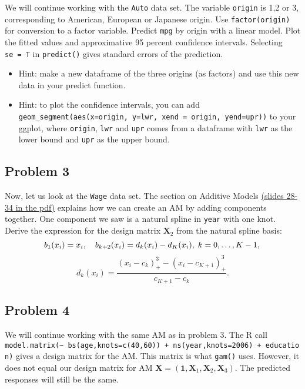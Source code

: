 \documentclass[
]{article}
\begin{document}
We will continue working with the \texttt{Auto} data set. The variable
\texttt{origin} is 1,2 or 3, corresponding to American, European or
Japanese origin. Use \texttt{factor(origin)} for conversion to a factor
variable. Predict \texttt{mpg} by origin with a linear model. Plot the
fitted values and approximative 95 percent confidence intervals.
Selecting \texttt{se\ =\ T} in \texttt{predict()} gives standard errors
of the prediction.

\begin{itemize}
\item
  Hint: make a new dataframe of the three origins (as factors) and use
  this new data in your predict function.
\item
  Hint: to plot the confidence intervals, you can add
  \texttt{geom\_segment(aes(x=origin,\ y=lwr,\ xend\ =\ origin,\ yend=upr))}
  to your ggplot, where \texttt{origin}, \texttt{lwr} and \texttt{upr}
  comes from a dataframe with \texttt{lwr} as the lower bound and
  \texttt{upr} as the upper bound.
\end{itemize}

\hypertarget{problem-3}{%
\subsection{Problem 3}\label{problem-3}}

Now, let us look at the \texttt{Wage} data set. The section on Additive
Models
\href{https://github.com/stefaniemuff/statlearning/blob/master/7BeyondLinear/7BeyondLinear.pdf}{(slides
28-34 in the pdf)} explains how we can create an AM by adding components
together. One component we saw is a natural spline in \texttt{year} with
one knot. Derive the expression for the design matrix \(\mathbf X_2\)
from the natural spline basis: \[
b_1(x_i) = x_i, \quad b_{k+2}(x_i) = d_k(x_i)-d_K(x_i),\; k = 0, \ldots, K - 1,\\
\] \[
d_k(x_i) = \frac{(x_i-c_k)^3_+-(x_i-c_{K+1})^3_+}{c_{K+1}-c_k}.
\]

\hypertarget{problem-4}{%
\subsection{Problem 4}\label{problem-4}}

We will continue working with the same AM as in problem 3. The R call
\texttt{model.matrix(\textasciitilde{}\ bs(age,knots=c(40,60))\ +\ ns(year,knots=2006)\ +\ education)}
gives a design matrix for the AM. This matrix is what \texttt{gam()}
uses. However, it does not equal our design matrix for AM
\(\mathbf X = (\mathbf{1}, \mathbf{X}_1, \mathbf{X}_2, \mathbf{X}_3)\).
The predicted responses will still be the same.
\end{document}
